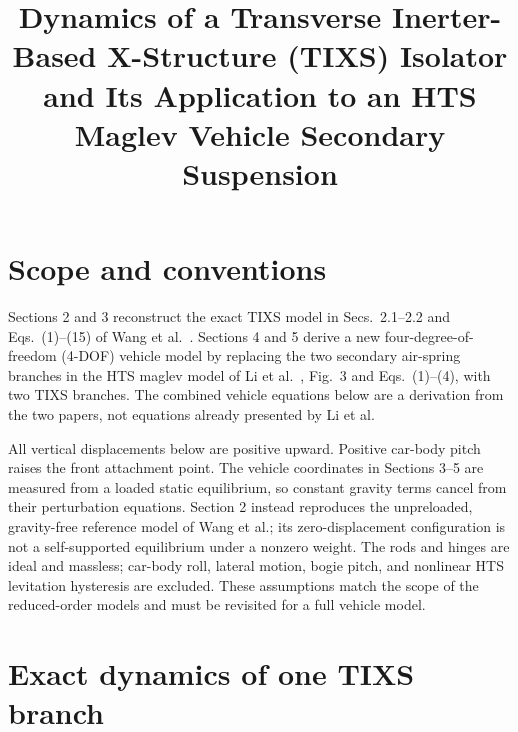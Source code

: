 \documentclass[a4paper,12pt]{article}
\title{Dynamics of a Transverse Inerter-Based X-Structure (TIXS) Isolator\\
and Its Application to an HTS Maglev Vehicle Secondary Suspension}
\author{}
\date{}
\numberwithin{equation}{section}
\begin{document}
\maketitle

\section{Scope and conventions}
Sections 2 and 3 reconstruct the exact TIXS model in Secs.~2.1--2.2 and Eqs.~(1)--(15) of Wang et al.~\cite{wang2024}. Sections 4 and 5 derive a new four-degree-of-freedom (4-DOF) vehicle model by replacing the two secondary air-spring branches in the HTS maglev model of Li et al.~\cite{li2021}, Fig.~3 and Eqs.~(1)--(4), with two TIXS branches. The combined vehicle equations below are a derivation from the two papers, not equations already presented by Li et al.

All vertical displacements below are positive upward. Positive car-body pitch raises the front attachment point. The vehicle coordinates in Sections 3--5 are measured from a loaded static equilibrium, so constant gravity terms cancel from their perturbation equations. Section 2 instead reproduces the unpreloaded, gravity-free reference model of Wang et al.; its zero-displacement configuration is not a self-supported equilibrium under a nonzero weight. The rods and hinges are ideal and massless; car-body roll, lateral motion, bogie pitch, and nonlinear HTS levitation hysteresis are excluded. These assumptions match the scope of the reduced-order models and must be revisited for a full vehicle model.

\section{Exact dynamics of one TIXS branch}
\end{document}
